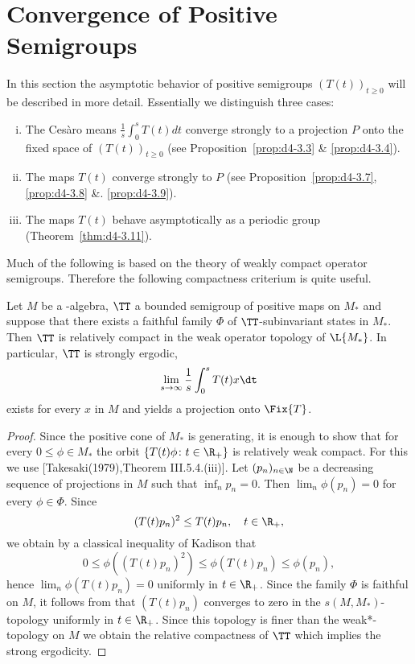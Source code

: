 \section{Convergence of Positive Semigroups}\label{sec:d4-3}

In this section the asymptotic behavior of positive semigroups $(T(t))_{t \geq 0}$ will be described in more detail.
Essentially we distinguish three cases:

\begin{enumerate}[(i)]
\item
The Cesàro means $\frac{1}{s}\int_{0}^{s} T(t)dt$ converge strongly to a projection $P$ onto the fixed space of $(T(t))_{t \geq 0}$ (see Proposition~\ref{prop:d4-3.3} \& \ref{prop:d4-3.4}).

\item
The maps $T(t)$ converge strongly to $P$ (see Proposition~\ref{prop:d4-3.7}, \ref{prop:d4-3.8} \&. \ref{prop:d4-3.9}).

\item
The maps $T(t)$ behave asymptotically as a periodic group (Theorem~\ref{thm:d4-3.11}).
\end{enumerate}
Much of the following is based on the theory of weakly compact operator semigroups.
Therefore the following compactness criterium is quite useful.
\begin{proposition}\label{prop:d4-3.1}
Let $M$ be a \WA-algebra, $\TT$ a bounded semigroup of positive maps on $M_{*}$ and suppose that there exists a faithful family $\Phi$ of\/ $\TT$-subinvariant states in $M_{*}$.
Then $\TT$ is relatively compact in the weak operator topology of $ \L{M_{*}} $.
In particular, $\TT$ is strongly ergodic, \ie 
%
\[
	\lim_{s \to \infty} \frac{1}{s}\int_{0}^{s} T(t)x \dt
\]
%
exists for every $x$ in $M$ and yields a projection onto $\Fix{T}$.
\end{proposition}
%
\begin{proof}
Since the positive cone of $M_{*}$ is generating, it is enough to show that for every $0 \leq \phi \in M_{*}$ the orbit $\{T(t)\phi \colon t \in \R_{+}\}$ is relatively weak compact.
For this we use [Takesaki(1979),Theorem III.5.4.(iii)].
%
Let $(p_{n})_{n \in \N}$ be a decreasing sequence of projections in $M$ such that $\inf_{n} p_{n} = 0$.
Then $\lim_{n}\phi(p_{n}) = 0$ for every $\phi \in \Phi$.
Since
\[
	(T(t)p_{n})^2 \leq T(t)p_{n}, \quad t \in \R_{+},
\]
we obtain by a classical inequality of Kadison that
\[
0 \leq \phi((T(t)p_{n})^2) \leq \phi(T(t)p_{n}) \leq \phi(p_{n}),
\]
hence $\lim_{n}\phi(T(t)p_{n}) = 0$ uniformly in $t \in \R_{+}$.
Since the family $\Phi$ is faithful on $M$, it follows from \citet[Proposition III.5.3]{takesaki:1979} that $(T(t)p_{n})$ converges to zero in the $s(M,M_{*})$-topology uniformly in $t \in \R_{+}$.
Since this topology is finer than the weak*-topology on $M$ we obtain the relative compactness of\/ $\TT$ which implies the strong ergodicity.
\end{proof}
